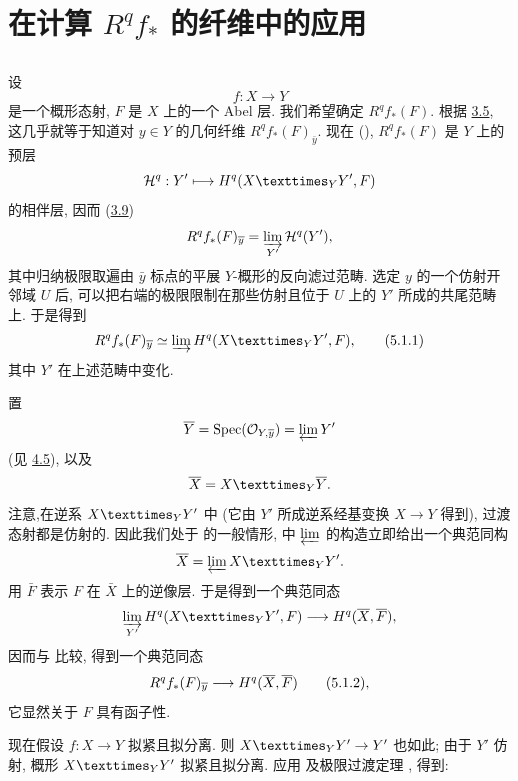 

\section{在计算 $R^qf_*$ 的纤维中的应用}

\subsection{}

设
$$
f:X\to Y
$$
是一个概形态射, $F$ 是 $X$ 上的一个 Abel 层.
我们希望确定 $R^qf_*(F)$.
根据 \hyperref[VIII.thm3.5]{3.5},
这几乎就等于知道对 $y\in Y$ 的几何纤维 $R^qf_*(F)_{\bar y}$.
现在 (),
$R^qf_*(F)$ 是 $Y$ 上的预层
$$
\Hh^q:Y'\longmapsto H^q(\fprod{X}{Y'}{Y},F)
$$
的相伴层, 因而 (\hyperref[VIII.prop3.9]{3.9})
$$
R^qf_*(F)_{\overline y}=\varinjlim_{Y'}{\mathcal H}^q(Y'){},
$$
其中归纳极限取遍由 $\bar{y}$ 标点的平展 $Y$-概形的反向滤过范畴.
选定 $y$ 的一个仿射开邻域 $U$ 后,
可以把右端的极限限制在那些仿射且位于 $U$ 上的 $Y'$ 所成的共尾范畴上.
于是得到
\begin{equation*}
R^qf_*(F)_{\bar y}\simeq
\varinjlim H^q(\fprod{X}{Y'}{Y},F){\quoi},
\tag{5.1.1}
\end{equation*}
其中 $Y'$ 在上述范畴中变化.

置
$$
\overline Y=\operatorname{Spec}({\mathcal O}_{Y,\overline y})=\varprojlim Y'
$$
(见 \hyperref[VIII.subsec4.5]{4.5}), 以及
$$
\bar X=\fprod{X}{\bar Y}{Y}{\quoi}.
$$
注意,\pageoriginale 在逆系 $\fprod{X}{Y'}{Y}$ 中
(它由 $Y'$ 所成逆系经基变换 $X\to Y$ 得到), 过渡态射都是仿射的.
因此我们处于  的一般情形,
\loccit 中 $\varprojlim$ 的构造立即给出一个典范同构
$$
\bar X=\varprojlim\fprod{X}{Y'}{Y}{\quoi}.
$$
用 $\bar F$ 表示 $F$ 在 $\bar X$ 上的逆像层.
于是得到一个典范同态
$$
\varinjlim_{Y'}H^q(\fprod{X}{Y'}{Y},F)
\longrightarrow H^q(\bar X,\bar F),
$$
因而与  比较, 得到一个典范同态
\begin{equation*}
R^qf_*(F)_{\overline y}\longrightarrow H^q(\overline X,\overline F)
\tag{5.1.2}{},
\end{equation*}
它显然关于 $F$ 具有函子性.

现在假设 $f:X\to Y$ 拟紧且拟分离.
则 $\fprod{X}{Y'}{Y}\to Y'$ 也如此;
由于 $Y'$ 仿射, 概形 $\fprod{X}{Y'}{Y}$ 拟紧且拟分离.
应用  及极限过渡定理
, 得到:

